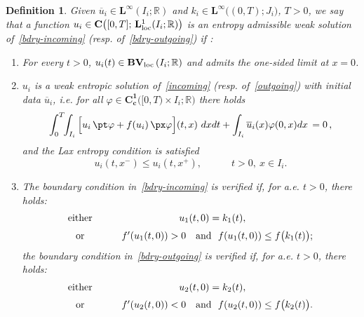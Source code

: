 \documentclass[a4paper, 10pt, final]{article}
\newtheorem{definition}{Definition}[section]
\newcommand{\R}{\mathbb{R}} \newcommand{\N}{\mathbb{N}}
\newcommand{\CCc}[1]{\mathbf{C^{#1}_c}}
\begin{document}
\begin{definition}
  \label{def-ent-sol-ibvp}
  Given $\overline u_i\in  \mathbf{L^\infty} (I_i;  \R)$ and
  $k_i\in \mathbf{L^\infty} \big((0,T);  J_i\big)$, $T>0$,
  we say that a function
  $u_i\in\mathbf{C}\big([0,T];\, \mathbf{L}^1_{{\rm loc}}
  (I_i;  \R)\big)$
  is an entropy admissible weak solution
  of~\eqref{bdry-incoming} (resp. of~\eqref{bdry-outgoing}) if :
  \begin{enumerate}[label=(\roman*) , align=left]
  \item For every $t > 0$,
    $u_i(t) \in \mathbf{BV_{\rm loc}}\left(I_i; \R\right)$ and admits the one-sided limit at $x=0$.

  \item $u_i$ is a weak entropic solution
    of~\eqref{incoming} (resp. of~\eqref{outgoing}) with initial data $\overline u_i$, i.e. for all 
    $\varphi\in\CCc{1}\big([0,T)\times I_i;  \R\big)$ there holds
    \begin{equation*}
      \int_0^T\!\!\int_{I_i}\Big[u_i\,  \pt\varphi + f(u_i)\, 
      \px\varphi \Big](t,x)~dxdt + \int_{I_i}\overline u_i (x)
      \varphi(0,x)dx\, = 0\,,
    \end{equation*}
    and the Lax entropy condition  is satisfied 
    \begin{equation*}
      u_i(t,x^-)\leq u_i(t,x^+),\qquad\quad
      t>0, \ x \in I_i.
    \end{equation*}
  \item\label{def:solution:bc}
    The boundary condition in~\eqref{bdry-incoming} is verified if,
    for a.e. $t>0$, there holds:
%
\begin{equation}
\label{Dir-bc-in}
  \begin{array}{c@{\qquad}c}
    \textrm{either} &  u_1(t,0)=k_1(t),
    \vspace{.1cm}
    \\
    \noalign{\smallskip}
    \textrm{or}  & \quad f'(u_1(t,0))> 0  \   \
    \textrm{ and } \ f(u_1(t,0))\leq 
    f\big(k_1(t)\big);
  \end{array}
\end{equation} 
%
the boundary condition in~\eqref{bdry-outgoing} is verified if,
for a.e. $t>0$, there holds:
%
\begin{equation*}
  \begin{array}{c@{\qquad}c}
    \textrm{either} &  u_2(t,0)=k_2(t),
    \vspace{.1cm}
    \\
    \noalign{\smallskip}
    \textrm{or}  &  \quad f'(u_2(t,0))< 0  \   \
    \textrm{ and } \ f(u_2(t,0))\leq 
    f\big(k_2(t)\big).
  \end{array}
\end{equation*} 
%
  \end{enumerate}
\end{definition}
\end{document}
